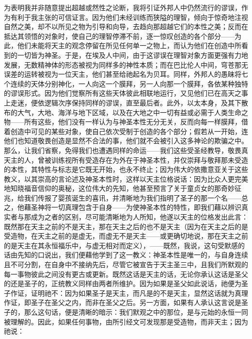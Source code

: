 为表明我并非随意提出超越或然性之论断，我将引证外邦人中仍然流行的谬误，作为有利于我主张的可信证言。因为他们未经训练而狭隘的理智，倾向于惊奇地注视自然之美，却不以所见之物为引导和向导，去趋向那超越它们的本性之美；反而在抵达其领悟的对象时，使自己的理智停滞不前，逐一惊叹创造的各个部分——为此，他们未能将天主的观念停留在所见任何单一之物上，而认为他们在创造中所看到的一切皆为神圣。于是，在埃及人中间，由于这谬误在理智对象方面更强有力地发展，无数精神体的形态被视为同样多的神性本质；而在巴比伦人中间，穹苍那无误差的运转被视为一位天主，他们甚至给祂起名为贝耳。同样，外邦人的愚昧将七个连续的天体分别神化，一人向这一个膜拜，另一人向那一个膜拜，各依某种独特的谬误形式。因为他们觉察所有这些天体彼此相联地运行，又见他们已在高天之事上走迷，便依逻辑次序保持同样的谬误，直至最后者。此外，以太本身，及其下散布的大气，大地、海洋与地下区域，以及在大地之中一切有益或必需于人类生命之物——所有这些，他们没有一样认为与神圣本性无分无关，反而向每一样膜拜，借着创造中可见的某些对象，使自己依次受制于创造的各个部分；假若从一开始，连他们也知道敬畏创造是显然不合法的事，他们就不会被引入这多神论的欺骗之中。那么，让我们省察，免得我们也遭遇同样的命运——我们这些受圣经教导，敬畏真天主的人，曾被训练视所有受造存在为外在于神圣本性，并仅崇拜与敬拜那未受造的本性，其特性与标志是它既无开始，也永不终止；因为伟大的依撒意亚关于这些教义，以其崇高的言论述及神圣本性时，这样以天主位格说话：因为比众人更完美地知晓福音信仰的奥秘，这位伟大的先知，他甚至预言了关于童贞女的那奇妙征兆，给我们传报了婴孩诞生的喜讯，并清晰地为我们指明了圣子的那一个名——总之，他藉圣神将一切真理包含于自身——为使神圣本性的特性，即我们藉以辨识真实者与那成为之者的区别，尽可能清晰地为人所知，他遂以天主的位格发出此言：既然那在天主之前的不是天主，那在天主之后的也不是天主（因为在天主之后的是受造物，在天主之前的是虚无，而虚无不是天主——或更确切地说，那在天主之前的是天主在其永恒福乐中，与虚无相对而定义），——既然，我说，这句受默感的话由先知的口说出，我们便藉他学到了这一教义：神圣本性是唯一的，与自身连续且不可分割，在自身中不接纳先后，尽管它被宣告于天主圣三中，且我们所默观的每一事物彼此之间没有更古或更新。既然这话是天主的话，无论你承认这话是圣父的还是圣子的，正统教义同样由两者所维护。因为如果是圣父如此说话，祂便为圣子作证，证明祂不：因为如果圣子是天主，而凡是的不是天主，显然这话就为真理作证，即圣子在圣父之内，而非在圣父之后。另一方面，如果有人承认这言说是圣子的，那么这句话，便是清晰的暗示：我们默观之中的那位，是与元始的永恒一同被理解的。因此，如果任何事物，由所引经文可发现那是受造物，而非天主；因为祂说：\par

